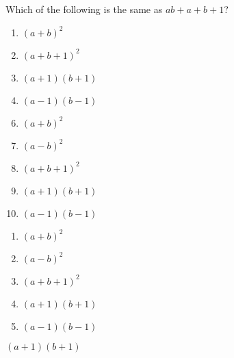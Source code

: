 


 Which of the following is the same as $ab+a+b+1$?


\ifsat
	\begin{enumerate}[label=\Alph*)]
		\item   $(a+b)^{2}$
		\item  $(a+b+1)^2$
		\item  $(a+1)(b+1)$%
		\item  $(a-1)(b-1)$
	\end{enumerate}
\else
\fi

\ifacteven
	\begin{enumerate}[label=\textbf{\Alph*.},itemsep=\fill,align=left]
		\setcounter{enumii}{5}
		\item   $(a+b)^{2}$
		\item  $(a-b)^{2}$
		\item  $(a+b+1)^2$
		\addtocounter{enumii}{1}
		\item  $(a+1)(b+1)$%
		\item  $(a-1)(b-1)$
	\end{enumerate}
\else
\fi

\ifactodd
	\begin{enumerate}[label=\textbf{\Alph*.},itemsep=\fill,align=left]
		\item   $(a+b)^{2}$
		\item  $(a-b)^{2}$
		\item  $(a+b+1)^2$
		\item  $(a+1)(b+1)$%
		\item  $(a-1)(b-1)$
	\end{enumerate}
\else
\fi

\ifgridin
  $(a+1)(b+1)$%
		
\else
\fi

